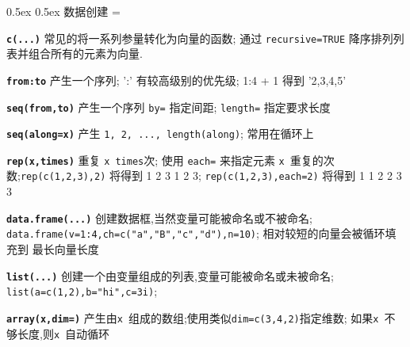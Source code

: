 \documentclass[landscape]{article}
\makeatletter
\renewcommand\section{\@startsection{section}{1}{0mm}%
                                     {0.5ex}%
                                     {0.5ex}%
                                {\color{black}\normalfont\large\bfseries}}
\newcommand{\code}{\texttt}
\newcommand{\bcode}[1]{\texttt{\textbf{#1}}}
\makeatother
\begin{document}
\begin{multicols*}{3}
\section{数据创建}
\everypar={\hangindent=9mm}

\bcode{c(...)} 常见的将一系列参量转化为向量的函数;
通过 \code{recursive=TRUE} 降序排列列表并组合所有的元素为向量.

\bcode{from:to} 产生一个序列; ':' 有较高级别的优先级; 1:4
+ 1 得到 '2,3,4,5'

\bcode{seq(from,to)} 产生一个序列
\code{by=} 指定间距; \code{length=} 指定要求长度


\bcode{seq(along=x)} 产生 \code{1, 2, ..., length(along)}; 常用在循环上

\bcode{rep(x,times)} 重复 \code{x}~\code{times}次; 使用 \code{each=}
来指定元素 \code{x}~重复的次数;\code{rep(c(1,2,3),2)} 将得到 1 2 3 1 2 3;
\code{rep(c(1,2,3),each=2)} 将得到 1 1 2 2 3 3

\bcode{data.frame(...)}  创建数据框,当然变量可能被命名或不被命名;
  \code{data.frame(v=1:4,ch=c("a","B","c","d"),n=10)}; 相对较短的向量会被循环填充到
  最长向量长度


\bcode{list(...)} 创建一个由变量组成的列表,变量可能被命名或未被命名;
  \code{list(a=c(1,2),b="hi",c=3i)};

\bcode{array(x,dim=)} 产生由\code{x}~组成的数组;使用类似\code{dim=c(3,4,2)}指定维数;
如果\code{x}~不够长度,则\code{x}~自动循环


\end{multicols*}
\end{document}
